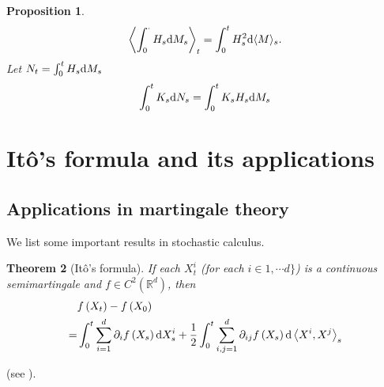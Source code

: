 \documentclass[twoside, 12pt]{book}
\numberwithin{equation}{chapter}
\newtheorem{theorem}{Theorem}[section]
\newtheorem{proposition}[theorem]{Proposition}
\def\mR{{\mathbb R}}
\def\l{\left}
\def\r{\right}
\def\<{\langle}
\def\>{\rangle}
\def\d{\text{\rm{d}}}
\begin{document}
	\begin{proposition}
		\begin{equation*}
			\l\<\int_0^\cdot H_s \d M_s\r\>_t= \int_0^t H_s^2 \d \<M\>_s. 
		\end{equation*}
		Let $N_t=\int_0^t H_s\d M_s$
		\begin{equation*}
			\int_0^t K_s\d N_s=\int_0^t K_s H_s \d M_s
		\end{equation*}
	\end{proposition}
	
	\section{It\^o's formula and its applications}
	
	\subsection{Applications in martingale theory}
	We list some important results in stochastic calculus. 
	\begin{theorem}[It\^o's formula]
		If each $X_t^i$ (for each $i\in 1,\cdots d\}$) is a continuous semimartingale and $f\in C^2(\mR^d)$, then \begin{equation}\label{eq:Ito}
			\begin{aligned}
				&f\left(X_t\right)  -f\left(X_0\right) \\
				= & \int_0^t \sum_{i=1}^d \partial_i f\left(X_s\right) \d X_s^i+\frac{1}{2} \int_0^t \sum_{i, j=1}^d \partial_{i j} f\left(X_s\right) \d\left\langle X^i, X^j\right\rangle_s
			\end{aligned}
		\end{equation}
	\end{theorem}
	(see \cite[Theorem 13.5]{Huang}). 
	
\end{document}
